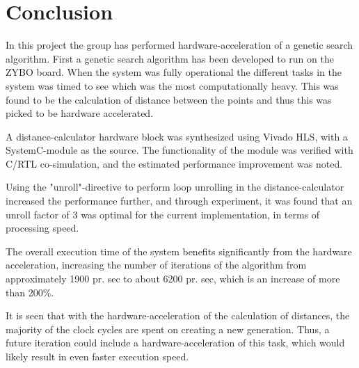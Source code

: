 
\chapter{Conclusion}
In this project the group has performed hardware-acceleration of a genetic search algorithm. First a genetic search algorithm has been developed to run on the ZYBO board. When the system was fully operational the different tasks in the system was timed to see which was the most computationally heavy. This was found to be the calculation of distance between the points and thus this was picked to be hardware accelerated. 

A distance-calculator hardware block was synthesized using Vivado HLS, with a SystemC-module as the source. The functionality of the module was verified with C/RTL co-simulation, and the estimated performance improvement was noted.

Using the "unroll"-directive to perform loop unrolling in the distance-calculator increased the performance further, and through experiment, it was found that an unroll factor of 3 was optimal for the current implementation, in terms of processing speed.

The overall execution time of the system benefits significantly from the hardware acceleration, increasing the number of iterations of the algorithm from approximately 1900 pr. sec to about 6200 pr. sec, which is an increase of more than 200\%.

It is seen that with the hardware-acceleration of the calculation of distances, the majority of the clock cycles are spent on creating a new generation. Thus, a future iteration could include a hardware-acceleration of this task, which would likely result in even faster execution speed.

